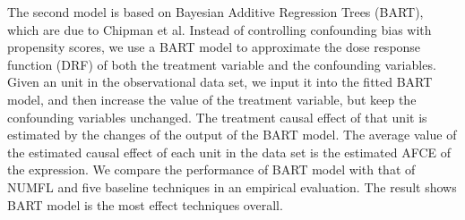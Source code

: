 The second model is based on Bayesian Additive Regression Trees (BART), which are due to Chipman et al. Instead of controlling confounding bias with propensity scores, we  use a BART model to approximate the dose response function (DRF) of both the treatment variable and the confounding variables. Given an unit in the observational data set, we input it into the fitted BART model, and then increase the value of the treatment variable, but keep the confounding variables unchanged. The treatment causal effect of that unit is estimated by the changes of the output of the BART model. The average value of the estimated causal effect of each unit in the data set is the estimated AFCE of the expression. We compare the performance of BART model with that of NUMFL and five baseline techniques in an empirical evaluation. The result shows BART model is the most effect techniques overall.  






